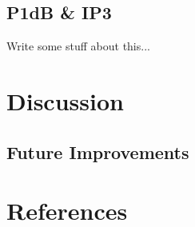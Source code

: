 \documentclass{article}                                                         %
\begin{document}
\subsection{P1dB \& IP3}
Write some stuff about this...
\newpage
\section{Discussion}
\subsection{Future Improvements}


\section{References}
\printbibliography[heading=none]
\end{document}
